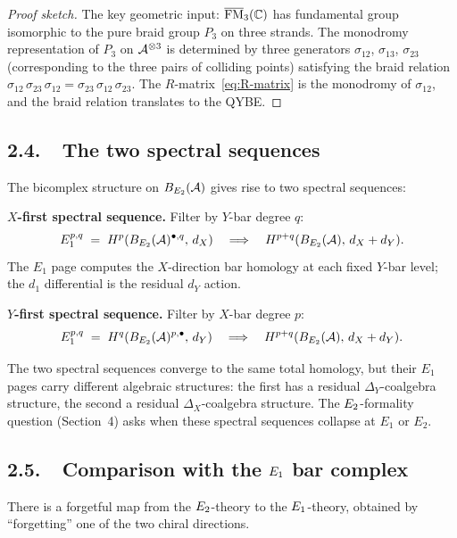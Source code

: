 \begin{proof}[Proof sketch]
The key geometric input: $\overline{\mathrm{FM}}_3(\mathbb{C})$ has fundamental group
isomorphic to the pure braid group $P_3$ on three strands.
The monodromy representation of $P_3$ on $\mathcal{A}^{\otimes 3}$ is
determined by three generators $\sigma_{12}$, $\sigma_{13}$,
$\sigma_{23}$ (corresponding to the three pairs of colliding points)
satisfying the braid relation
$\sigma_{12}\,\sigma_{23}\,\sigma_{12}
= \sigma_{23}\,\sigma_{12}\,\sigma_{23}$.
The $R$-matrix~\eqref{eq:R-matrix} is the monodromy of
$\sigma_{12}$, and the braid relation translates to the QYBE.
\end{proof}

\subsection*{2.4.\ \ The two spectral sequences}

The bicomplex structure on $B_{E_2}(\mathcal{A})$ gives rise to two spectral
sequences:

\medskip
\noindent\textbf{$X$-first spectral sequence.}
Filter by $Y$-bar degree $q$:
\[
 E_1^{p,q} \;=\; H^p(B_{E_2}(\mathcal{A})^{\bullet, q},\, d_X)
 \quad\Longrightarrow\quad
 H^{p+q}(B_{E_2}(\mathcal{A}),\, d_X + d_Y).
\]
The $E_1$ page computes the $X$-direction bar homology at each fixed
$Y$-bar level; the $d_1$ differential is the residual $d_Y$ action.

\medskip
\noindent\textbf{$Y$-first spectral sequence.}
Filter by $X$-bar degree $p$:
\[
 E_1^{p,q} \;=\; H^q(B_{E_2}(\mathcal{A})^{p, \bullet},\, d_Y)
 \quad\Longrightarrow\quad
 H^{p+q}(B_{E_2}(\mathcal{A}),\, d_X + d_Y).
\]

The two spectral sequences converge to the same total homology, but
their $E_1$ pages carry different algebraic structures: the first
has a residual $\Delta_Y$-coalgebra structure, the second a residual
$\Delta_X$-coalgebra structure. The $E_2$-formality question
(Section~4) asks when these spectral sequences collapse at $E_1$
or $E_2$.

\subsection*{2.5.\ \ Comparison with the $E_1$ bar complex}

There is a forgetful map from the $E_2$-theory to the
$E_1$-theory, obtained by ``forgetting'' one of the two chiral
directions.

